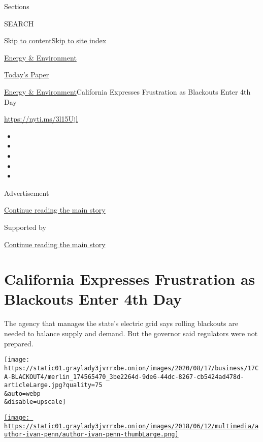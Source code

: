 Sections

SEARCH

\protect\hyperlink{site-content}{Skip to
content}\protect\hyperlink{site-index}{Skip to site index}

\href{https://www.nytimes3xbfgragh.onion/section/business/energy-environment}{Energy
\& Environment}

\href{https://myaccount.nytimes3xbfgragh.onion/auth/login?response_type=cookie\&client_id=vi}{}

\href{https://www.nytimes3xbfgragh.onion/section/todayspaper}{Today's
Paper}

\href{/section/business/energy-environment}{Energy \&
Environment}\textbar{}California Expresses Frustration as Blackouts
Enter 4th Day

\url{https://nyti.ms/3l15Ujl}

\begin{itemize}
\item
\item
\item
\item
\item
\end{itemize}

Advertisement

\protect\hyperlink{after-top}{Continue reading the main story}

Supported by

\protect\hyperlink{after-sponsor}{Continue reading the main story}

\hypertarget{california-expresses-frustration-as-blackouts-enter-4th-day}{%
\section{California Expresses Frustration as Blackouts Enter 4th
Day}\label{california-expresses-frustration-as-blackouts-enter-4th-day}}

The agency that manages the state's electric grid says rolling blackouts
are needed to balance supply and demand. But the governor said
regulators were not prepared.

\texttt{[image: https://static01.graylady3jvrrxbe.onion/images/2020/08/17/business/17CA-BLACKOUT4/merlin\_174565470\_3be2264d-9de6-44dc-8267-cb5424ad478d-articleLarge.jpg?quality=75\\\&auto=webp\\\&disable=upscale]}

\href{https://www.nytimes3xbfgragh.onion/by/ivan-penn}{\texttt{[image: https://static01.graylady3jvrrxbe.onion/images/2018/06/12/multimedia/author-ivan-penn/author-ivan-penn-thumbLarge.png]}}

